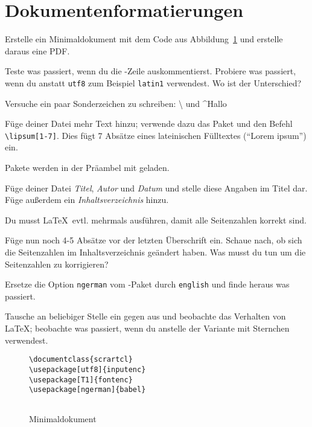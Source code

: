 \section{Dokumentenformatierungen}
\begin{uebung}
\item Erstelle ein Minimaldokument mit dem Code aus 
	Abbildung~\ref{minimaldoc} und erstelle daraus eine PDF.\label{firststart:first}
\item Teste was passiert, wenn du die -Zeile auskommentierst.
    Probiere was passiert, wenn du anstatt \texttt{utf8} zum Beispiel
    \texttt{latin1} verwendest. Wo ist der Unterschied?\label{inputenc}
\item Versuche ein paar Sonderzeichen zu schreiben: \textbackslash{} und \^{}Hallo\label{specialchars}
\item Füge deiner Datei mehr Text hinzu; verwende dazu das Paket 
	 und den Befehl \verb+\lipsum[1-7]+. Dies fügt
	7 Absätze eines lateinischen Fülltextes (\enquote{Lorem ipsum}) ein.
	\begin{hinweis}
	    Pakete werden in der Präambel mit  geladen.
	\end{hinweis}\label{firststart:last}
\item Füge deiner Datei \emph{Titel}, \emph{Autor} und 
	\emph{Datum} und stelle diese Angaben im Titel dar.
	Füge außerdem ein \emph{Inhaltsverzeichnis} hinzu.
	\begin{hinweis}
	    Du musst \LaTeX\ evtl. mehrmals ausführen, damit alle 
		Seitenzahlen korrekt sind.
	\end{hinweis}\label{markup:first}
\item Füge nun noch 4-5 Absätze vor der letzten Überschrift ein.
    Schaue nach, ob sich die Seitenzahlen im Inhaltsverzeichnis geändert haben.
    Was musst du tun um die Seitenzahlen zu korrigieren?
\item Ersetze die Option \texttt{ngerman} vom -Paket durch
	\texttt{english} und finde heraus was passiert.
\item Tausche an beliebiger Stelle ein  gegen 
	 aus und beobachte das Verhalten von \LaTeX; 
	beobachte was passiert, wenn du  
	anstelle der Variante mit Sternchen verwendest.
	\label{aufg:sectionstar}

\begin{figure}[h]
	\begin{minipage}[t]{.5\textwidth}
	\caption{Minimaldokument}\label{minimaldoc}
	\begin{verbatim}
\documentclass{scrartcl}
\usepackage[utf8]{inputenc}
\usepackage[T1]{fontenc}
\usepackage[ngerman]{babel}


\end{verbatim}
\end{minipage}
\end{figure}
\end{uebung}
